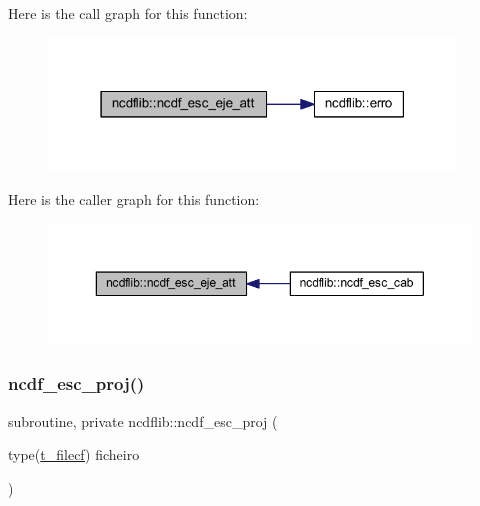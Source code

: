 Here is the call graph for this function\+:\nopagebreak
\begin{figure}[H]
\begin{center}
\leavevmode
\includegraphics[width=307pt]{namespacencdflib_a9357ce05485fdb83f341289a30c10ce1_cgraph}
\end{center}
\end{figure}
Here is the caller graph for this function\+:\nopagebreak
\begin{figure}[H]
\begin{center}
\leavevmode
\includegraphics[width=350pt]{namespacencdflib_a9357ce05485fdb83f341289a30c10ce1_icgraph}
\end{center}
\end{figure}
\mbox{\label{namespacencdflib_ab26646e33f23098c9a84e29cc33af7bc}} 
\subsubsection{\texorpdfstring{ncdf\+\_\+esc\+\_\+proj()}{ncdf\_esc\_proj()}}
{\footnotesize\ttfamily subroutine, private ncdflib\+::ncdf\+\_\+esc\+\_\+proj (\begin{DoxyParamCaption}\item[{type(\mbox{\hyperlink{structncdflib_1_1t__filecf}{t\+\_\+filecf}})}]{ficheiro }\end{DoxyParamCaption})\hspace{0.3cm}{\ttfamily [private]}}

